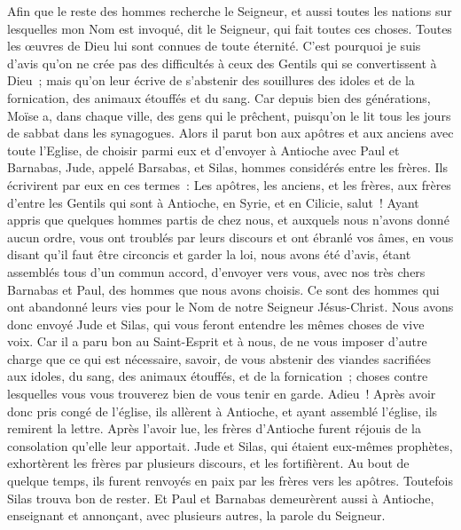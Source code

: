 \begin{multicols}{2}
Afin que le reste des hommes recherche le Seigneur, et aussi toutes les nations sur lesquelles mon Nom est invoqué, dit le Seigneur, qui fait toutes ces choses.
Toutes les œuvres de Dieu lui sont connues de toute éternité.
C'est pourquoi je suis d'avis qu'on ne crée pas des difficultés à ceux des Gentils qui se convertissent à Dieu~;
mais qu'on leur écrive de s'abstenir des souillures des idoles et de la fornication, des animaux étouffés et du sang.
Car depuis bien des générations, Moïse a, dans chaque ville, des gens qui le prêchent, puisqu'on le lit tous les jours de sabbat dans les synagogues.
Alors il parut bon aux apôtres et aux anciens avec toute l'Eglise, de choisir parmi eux et d'envoyer à Antioche avec Paul et Barnabas, Jude, appelé Barsabas, et Silas, hommes considérés entre les frères.
Ils écrivirent par eux en ces termes~: Les apôtres, les anciens, et les frères, aux frères d'entre les Gentils qui sont à Antioche, en Syrie, et en Cilicie, salut~!
Ayant appris que quelques hommes partis de chez nous, et auxquels nous n'avons donné aucun ordre, vous ont troublés par leurs discours et ont ébranlé vos âmes, en vous disant qu'il faut être circoncis et garder la loi,
nous avons été d'avis, étant assemblés tous d'un commun accord, d'envoyer vers vous, avec nos très chers Barnabas et Paul, des hommes que nous avons choisis. 
Ce sont des hommes qui ont abandonné leurs vies pour le Nom de notre Seigneur Jésus-Christ.
Nous avons donc envoyé Jude et Silas, qui vous feront entendre les mêmes choses de vive voix.
Car il a paru bon au Saint-Esprit et à nous, de ne vous imposer d'autre charge que ce qui est nécessaire,
savoir, de vous abstenir des viandes sacrifiées aux idoles, du sang, des animaux étouffés, et de la fornication~; choses contre lesquelles vous vous trouverez bien de vous tenir en garde. Adieu~!
Après avoir donc pris congé de l'église, ils allèrent à Antioche, et ayant assemblé l'église, ils remirent la lettre.
Après l'avoir lue, les frères d'Antioche furent réjouis de la consolation qu'elle leur apportait.
Jude et Silas, qui étaient eux-mêmes prophètes, exhortèrent les frères par plusieurs discours, et les fortifièrent.
Au bout de quelque temps, ils furent renvoyés en paix par les frères vers les apôtres.
Toutefois Silas trouva bon de rester.
Et Paul et Barnabas demeurèrent aussi à Antioche, enseignant et annonçant, avec plusieurs autres, la parole du Seigneur.

\end{multicols}
